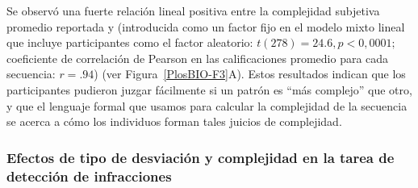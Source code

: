 Se observó una fuerte relación lineal positiva entre la complejidad subjetiva promedio reportada y \mdlbin (introducida como un factor fijo en el modelo mixto lineal que incluye participantes como el factor aleatorio: $t (278) = 24.6, p < 0,0001;$ coeficiente de correlación de Pearson en las calificaciones promedio para cada secuencia: $r = .94$) (ver Figura~\ref{PlosBIO-F3}A). Estos resultados indican que los participantes pudieron juzgar fácilmente si un patrón es ``más complejo'' que otro, y que el lenguaje formal que usamos para calcular la complejidad de la secuencia se acerca a cómo los individuos forman tales juicios de complejidad.

\subsubsection*{Efectos de tipo de desviación y complejidad en la tarea de detección de infracciones}


